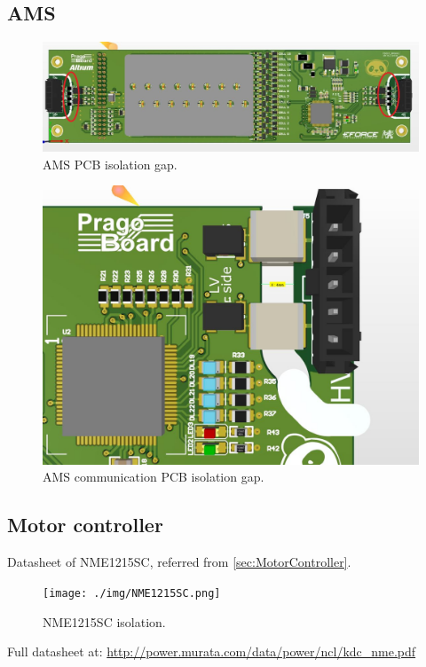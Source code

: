 \newcommand{\insertOnce}[1]{
	\ifundef{\once}{#1 \global\def\once{}}{}
}

\newcommand{\insertOnceReset}{
	\global\undef{\once}	
}

\newcommand{\addDsh}[5]{
		
	\insertOnceReset
}


\subsection{AMS}
\begin{figure}[H]
	\centering
	\includegraphics[width=.8\textwidth]{./img/bms_3d.jpg}
	\caption{AMS PCB isolation gap.}
	\label{app:ams-3d}
\end{figure}
\begin{figure}[H]
	\centering
	\includegraphics[width=.5\textwidth]{./img/3d_prevodnik.jpg}
	\caption{AMS communication PCB isolation gap.}
	\label{app:ams-3d-prevodnik}
\end{figure}

\subsection{Motor controller}

Datasheet of NME1215SC, referred from \ref{sec:MotorController}.
\begin{figure}[H]
	\centering
	\texttt{[image: ./img/NME1215SC.png]}
	\caption{NME1215SC isolation.}
	\label{app:NME1215SC}
\end{figure}
Full datasheet at: \url{http://power.murata.com/data/power/ncl/kdc_nme.pdf}

